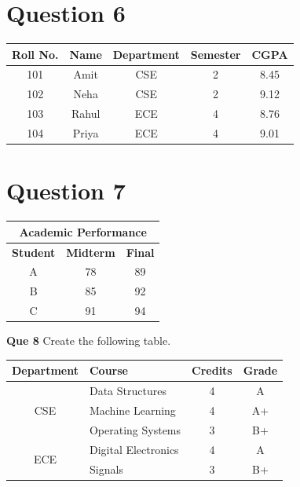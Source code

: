 \documentclass{article}
\begin{document}
\section{Question 6}
\begin{center}
\begin{tabular}{|c|c|c|c|c|}
\hline
\textbf{Roll No.} & \textbf{Name} & \textbf{Department} & \textbf{Semester} & \textbf{CGPA} \\
\hline
101 & Amit  & CSE & 2 & 8.45 \\
102 & Neha  & CSE & 2 & 9.12 \\
103 & Rahul & ECE & 4 & 8.76 \\
104 & Priya & ECE & 4 & 9.01 \\
\hline
\end{tabular}
\end{center}
\section{Question 7}
\begin{center}
\begin{tabular}{|c|c|c|}
\hline
\multicolumn{3}{|c|}{\textbf{Academic Performance}} \\
\hline
\textbf{Student} & \textbf{Midterm} & \textbf{Final} \\
\hline
A & 78 & 89 \\
B & 85 & 92 \\
C & 91 & 94 \\
\hline
\end{tabular}
\end{center}
\noindent\textbf{Que 8} Create the following table.

\begin{center}
\begin{tabular}{|c|l|c|c|}
\hline
\textbf{Department} & \textbf{Course} & \textbf{Credits} & \textbf{Grade} \\
\hline
\multirow{3}{*}{CSE} & Data Structures   & 4 & A  \\
                     & Machine Learning  & 4 & A+ \\
                     & Operating Systems & 3 & B+ \\
\hline
\multirow{2}{*}{ECE} & Digital Electronics & 4 & A  \\
                     & Signals             & 3 & B+ \\
\hline
\end{tabular}
\end{center}
\end{document}
